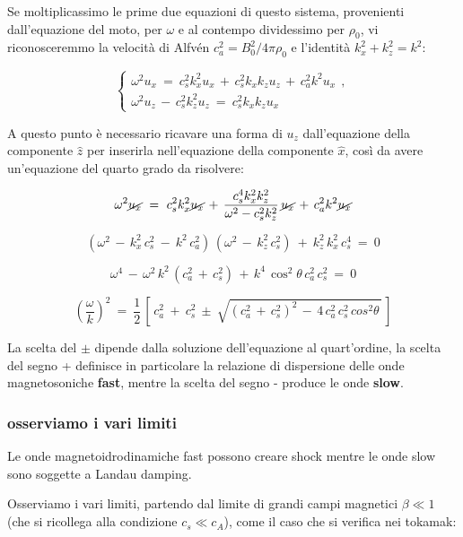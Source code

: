 Se moltiplicassimo le prime due equazioni di questo sistema, provenienti dall'equazione del moto, per $\omega$ e al contempo dividessimo per $\rho_0$, vi riconosceremmo la velocità di Alfvén $c_a^2=B^2_0 /4\pi \rho_0$ e l'identità $k_x^2 + k_z^2 = k^2$:

\[\begin{cases}
	\omega^2 u_x\ =\ c^2_s k^2_x u_x\, +\, c^2_s k_x k_z u_z \, +\, c_a^2 k^2 u_x\ \ ,\\
	\omega^2 u_z\, -\, c^2_s k^2_z u_z\ =\ c^2_s k_x k_z u_x
\end{cases}\]

A questo punto è necessario ricavare una forma di $u_z$ dall'equazione della componente $\hat z$ per inserirla nell'equazione della componente $\hat x$, così da avere un'equazione del quarto grado da risolvere:

\[\omega^2 \cancel{u_x}\ =\ c^2_s k^2_x \cancel{u_x} \, +\, \frac{c^4_s k^2_x k^2_z }{\omega^2 - c^2_s k^2_z}\, \cancel{u_x}\, +\, c_a^2 k^2 \cancel{u_x}\]


\[ (\omega^2\, -\, k^2_x\, c^2_s\ -\ k^2\, c^2_a)\,(\omega^2\, -\, k^2_z\, c^2_s)\ +\ k^2_z\, k^2_x\, c^4_s\ =\ 0 \]

\[ \omega^4 \,-\, \omega^2\, k^2\, (c^2_a\, +\, c^2_s)\, +\, k^4\, \cos^2\theta\, c^2_a\, c^2_s\ =\ 0 \]

\begin{equation}\label{dispersione magnetosoniche}
	\boxed{\ \left( \frac{\omega}{k} \right)^2\ =\ \frac{1}{2}\, \left[\, c^2_a\ +\ c^2_s\ \pm\ \sqrt{(c_a^2\, +\, c_s^2)^2\, -\, 4\, c^2_a\, c^2_s\, cos^2\theta\,}\, \right]\ }
\end{equation}

La scelta del $\pm$ dipende dalla soluzione dell'equazione al quart'ordine, la scelta del segno + definisce in particolare la relazione di dispersione delle onde magnetosoniche \textbf{fast}, mentre la scelta del segno - produce le onde \textbf{slow}.


%
\subsubsection{osserviamo i vari limiti}

Le onde magnetoidrodinamiche fast possono creare shock mentre le onde slow sono soggette a Landau damping.

Osserviamo i vari limiti, partendo dal limite di grandi campi magnetici $\boxed{\beta \ll 1}$ (che si ricollega alla condizione $c_s\ll c_A$), come il caso che si verifica nei tokamak: 

